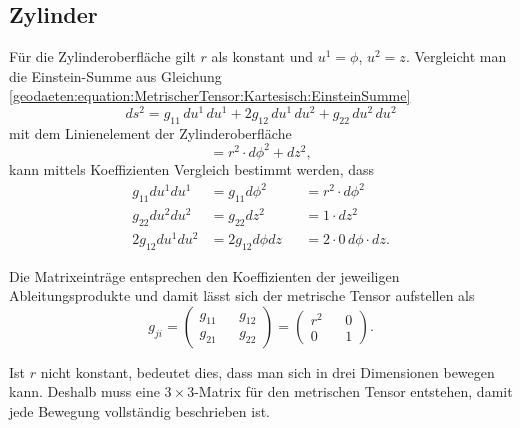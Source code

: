 %
%
%
%
\subsection{Zylinder\label{geodaeten:section:MetrischerTensor:Zylinder}}

Für die Zylinderoberfläche gilt $r$ als konstant und $u^1 = \phi$, $u^2 =z$.
Vergleicht man die Einstein-Summe aus Gleichung \eqref{geodaeten:equation:MetrischerTensor:Kartesisch:EinsteinSumme}
\begin{equation}
	ds^2 = g_{11} \, du^1 \, du^1 + 2g_{12} \, du^1 \, du^2 + g_{22} \, du^2 \, du^2
\end{equation}
mit dem Linienelement der Zylinderoberfläche
\begin{equation}
	= r^2 \cdot d \phi^2 +dz^2 ,
\end{equation}
kann mittels Koeffizienten Vergleich bestimmt werden, dass
\begin{equation}
	\begin{alignedat}{3}
		g_{11}  du^1 du^1 &= g_{11}  d \phi^2 & &= r^2 \cdot d \phi^2 \\
		g_{22}  du^2 du^2 &= g_{22}  dz^2    & &= 1 \cdot dz^2 \\
		2g_{12}  du^1 du^2 &= 2g_{12}  d \phi  dz & &= 2\cdot0 \, d \phi \cdot dz.

	\end{alignedat}
\end{equation}

Die Matrixeinträge entsprechen den Koeffizienten der jeweiligen Ableitungsprodukte und damit lässt sich der metrische Tensor aufstellen als
\begin{equation}
	g_{ji} =\begin{pmatrix} g_{11} && g_{12} \\ g_{21} && g_{22} \end{pmatrix}= \begin{pmatrix} r^2 && 0 \\ 0 && 1 \end{pmatrix} .
\end{equation}

Ist $r$ nicht konstant, bedeutet dies, dass man sich in drei Dimensionen bewegen kann.
Deshalb muss eine $3 \times 3$-Matrix für den metrischen Tensor entstehen, damit jede Bewegung vollständig beschrieben ist. 


